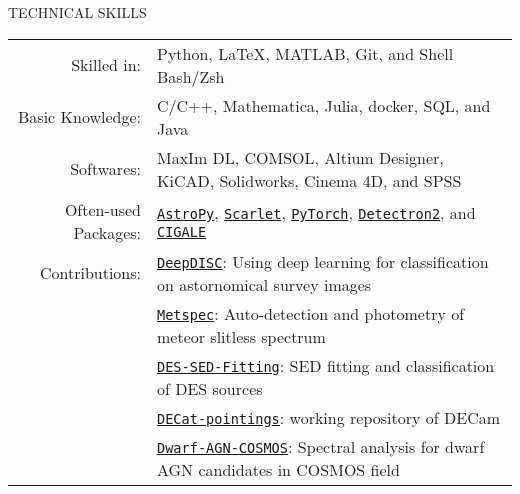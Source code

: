\documentclass[10pt]{article} %
\begin{document}
\begin{section}{TECHNICAL SKILLS}

\begin{tabular}{rl}
    Skilled in: & Python, \LaTeX, MATLAB, Git, and Shell Bash/Zsh \\
    Basic Knowledge: & C/C++, Mathematica, Julia, docker, SQL, and Java \\
    Softwares: & MaxIm DL, COMSOL, Altium Designer, KiCAD, Solidworks, Cinema 4D, and SPSS \\
    Often-used Packages: & \href{https://www.astropy.org/}{\texttt{AstroPy}}, \href{https://github.com/pmelchior/scarlet}{\texttt{Scarlet}}, \href{https://pytorch.org/}{\texttt{PyTorch}}, \href{https://github.com/facebookresearch/detectron2}{\texttt{Detectron2}}, and \href{https://cigale.lam.fr/}{\texttt{CIGALE}} \\
    Contributions: & \href{https://github.com/burke86/deepdisc}{\texttt{DeepDISC}}: Using deep learning for classification on astornomical survey images \\
    & \href{https://github.com/Chisen-Lupus/metspec}{\texttt{Metspec}}: Auto-detection and photometry of meteor slitless spectrum \\
    & \href{https://github.com/Chisen-Lupus/DES-SED-fitting}{\texttt{DES-SED-Fitting}}: SED fitting and classification of DES sources \\
    & \href{https://github.com/gnarayan/decat_pointings}{\texttt{DECat-pointings}}: working repository of DECam \\
    & \href{https://github.com/burke86/dwarf_agn_cosmos}{\texttt{Dwarf-AGN-COSMOS}}: Spectral analysis for dwarf AGN candidates in COSMOS field
\end{tabular}

\end{section} 
\end{document}
